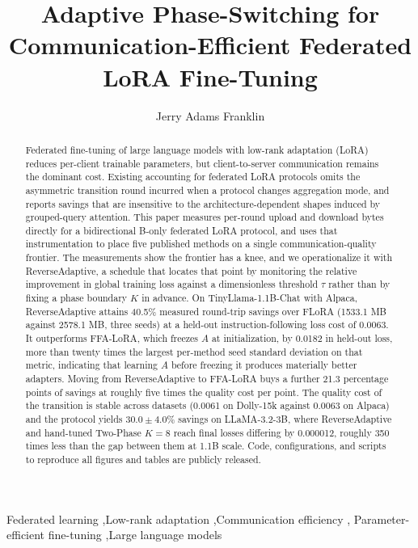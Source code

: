 \documentclass[preprint,review,12pt]{elsarticle}
\begin{document}
\raggedbottom
\begin{frontmatter}

\title{Adaptive Phase-Switching for Communication-Efficient Federated LoRA Fine-Tuning}

\author[ind]{Jerry Adams Franklin}
\address[ind]{Independent Researcher, Rochester, NY, USA}

\begin{abstract}
Federated fine-tuning of large language models with low-rank adaptation (LoRA)
reduces per-client trainable parameters, but client-to-server communication
remains the dominant cost. Existing accounting for federated LoRA protocols
omits the asymmetric transition round incurred when a protocol changes
aggregation mode, and reports savings that are insensitive to the
architecture-dependent shapes induced by grouped-query attention. This paper
measures per-round upload and download bytes directly for a bidirectional
B-only federated LoRA protocol, and uses that instrumentation to place five
published methods on a single communication-quality frontier. The measurements
show the frontier has a knee, and we operationalize it with ReverseAdaptive, a
schedule that locates that point by monitoring the relative improvement in
global training loss against a dimensionless threshold $\tau$ rather than by
fixing a phase boundary $K$ in advance. On
TinyLlama-1.1B-Chat with Alpaca, ReverseAdaptive attains 40.5\% measured
round-trip savings over FLoRA (1533.1 MB against 2578.1 MB, three seeds) at a
held-out instruction-following loss cost of 0.0063. It outperforms FFA-LoRA,
which freezes $A$ at initialization, by 0.0182 in held-out loss, more than
twenty times the largest per-method seed standard deviation on that metric,
indicating that
learning $A$ before freezing it produces materially better adapters. Moving
from ReverseAdaptive to FFA-LoRA buys a further 21.3 percentage points of
savings at roughly five times the quality cost per point. The quality cost of the transition is stable across
datasets (0.0061 on Dolly-15k against 0.0063 on Alpaca) and the protocol
yields $30.0 \pm 4.0$\% savings on LLaMA-3.2-3B, where ReverseAdaptive and
hand-tuned Two-Phase $K{=}8$ reach final losses differing by 0.000012, roughly
350 times less than the gap between them at 1.1B scale. Code, configurations, and scripts to
reproduce all figures and tables are publicly released.
\end{abstract}

\begin{keyword}
Federated learning \sep Low-rank adaptation \sep Communication efficiency \sep
Parameter-efficient fine-tuning \sep Large language models
\end{keyword}

\end{frontmatter}
\end{document}
